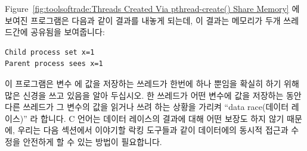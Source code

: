 Figure~\ref{fig:toolsoftrade:Threads Created Via pthread-create() Share Memory}
에 보여진 프로그램은 다음과 같이 결과를 내놓게 되는데, 이 결과는 메모리가 두개
쓰레드간에 공유됨을 보여줍니다:

\vspace{5pt}
\begin{minipage}[t]{\columnwidth}
\scriptsize
\begin{verbatim}
Child process set x=1
Parent process sees x=1
\end{verbatim}
\end{minipage}
\vspace{5pt}

이 프로그램은 변수  에 값을 저장하는 쓰레드가 한번에 하나 뿐임을 확실히
하기 위해 많은 신경을 쓰고 있음을 알아 두십시오.
한 쓰레드가 어떤 변수에 값을 저장하는 동안 다른 쓰레드가 그 변수의 값을 읽거나
쓰려 하는 상황을 가리켜 ``data race(데이터 레이스)'' 라 합니다.
C 언어는 데이터 레이스의 결과에 대해 어떤 보장도 하지 않기 때문에, 우리는 다음
섹션에서 이야기할 락킹 도구들과 같이 데이터에의 동시적 접근과 수정을 안전하게
할 수 있는 방법이 필요합니다.

